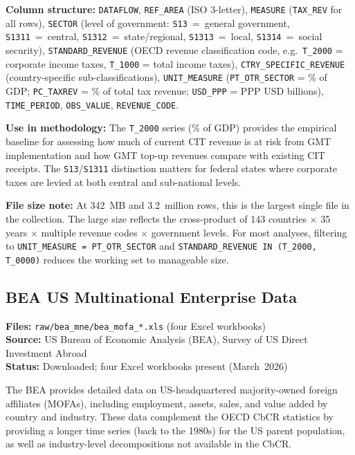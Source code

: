 \documentclass[11pt,a4paper]{article}
\newcommand{\code}[1]{\texttt{#1}}
\begin{document}
\noindent\textbf{Column structure:} \texttt{DATAFLOW}, \texttt{REF\_AREA} (ISO 3-letter), \texttt{MEASURE} (\code{TAX\_REV} for all rows), \texttt{SECTOR} (level of government: \texttt{S13}~=~general government, \texttt{S1311}~=~central, \texttt{S1312}~=~state/regional, \texttt{S1313}~=~local, \texttt{S1314}~=~social security), \texttt{STANDARD\_REVENUE} (OECD revenue classification code, e.g.\ \texttt{T\_2000} = corporate income taxes, \texttt{T\_1000} = total income taxes), \texttt{CTRY\_SPECIFIC\_REVENUE} (country-specific sub-classifications), \texttt{UNIT\_MEASURE} (\texttt{PT\_OTR\_SECTOR} = \% of GDP; \texttt{PC\_TAXREV} = \% of total tax revenue; \texttt{USD\_PPP} = PPP USD billions), \texttt{TIME\_PERIOD}, \texttt{OBS\_VALUE}, \texttt{REVENUE\_CODE}.

\noindent\textbf{Use in methodology:} The \texttt{T\_2000} series (\% of GDP) provides the empirical baseline for assessing how much of current CIT revenue is at risk from GMT implementation and how GMT top-up revenues compare with existing CIT receipts.  The \texttt{S13}/\texttt{S1311} distinction matters for federal states where corporate taxes are levied at both central and sub-national levels.

\noindent\textbf{File size note:} At 342~MB and 3.2~million rows, this is the largest single file in the collection.  The large size reflects the cross-product of 143 countries $\times$ 35 years $\times$ multiple revenue codes $\times$ government levels.  For most analyses, filtering to \texttt{UNIT\_MEASURE = PT\_OTR\_SECTOR} and \texttt{STANDARD\_REVENUE IN (T\_2000, T\_0000)} reduces the working set to manageable size.


\subsection{BEA US Multinational Enterprise Data}\label{sec:bea}

\textbf{Files:} \texttt{raw/bea\_mne/bea\_mofa\_*.xls} (four Excel workbooks)\\
\textbf{Source:} US Bureau of Economic Analysis (BEA), Survey of US Direct Investment Abroad\\
\textbf{Status:} Downloaded; four Excel workbooks present (March~2026)

The BEA provides detailed data on US-headquartered majority-owned foreign affiliates (MOFAs), including employment, assets, sales, and value added by country and industry.  These data complement the OECD CbCR statistics by providing a longer time series (back to the 1980s) for the US parent population, as well as industry-level decompositions not available in the CbCR.
\end{document}
